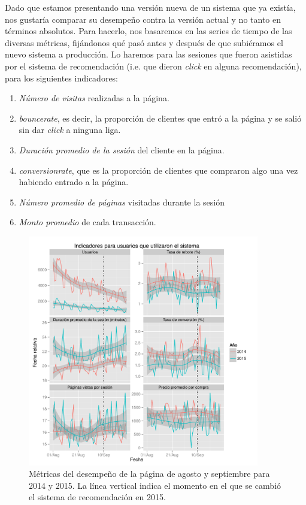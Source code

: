 \documentclass[12pt]{report}
\begin{document}
Dado que estamos presentando una versión nueva de un sistema que ya existía, nos gustaría comparar su desempeño contra la versión actual y no tanto en términos absolutos. Para hacerlo, nos basaremos en las series de tiempo de las diversas métricas, fijándonos qué pasó antes y después de que subiéramos el nuevo sistema a producción. Lo haremos para las sesiones que fueron asistidas por el sistema de recomendación (i.e. que dieron \emph{click} en alguna recomendación), para los siguientes indicadores:
\begin{enumerate}
	\item \emph{Número de \glspl{visita}} realizadas a la página.
	\item \emph{\Gls{bouncerate}}, es decir, la proporción de clientes que entró a la página y se salió sin dar \emph{click} a ninguna liga.
	\item \emph{Duración promedio de la sesión} del cliente en la página.
	\item \emph{\Gls{conversionrate}}, que es la proporción de clientes que compraron algo una vez habiendo entrado a la página.
	\item \emph{Número promedio de páginas} visitadas durante la sesión
	\item \emph{Monto promedio} de cada transacción.
\end{enumerate}

\begin{figure}[ht]
	\centering
	\includegraphics[width=0.9\textwidth]{imagenes/analytics_anios_x.pdf}
	\caption{\label{fig:analytics_x} Métricas del desempeño de la página de agosto y septiembre para 2014 y 2015. La línea vertical indica el momento en el que se cambió el sistema de recomendación en 2015.}
\end{figure}
\end{document}
